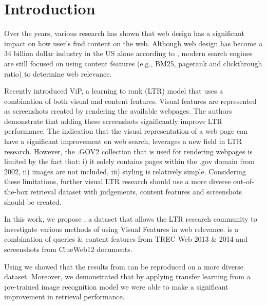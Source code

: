 

\section{Introduction}
Over the years, various research has shown that web design has a significant impact on how user's find content on the web\cite{nielsen1999designing}\cite{nielsen2006f}\cite{pernice2017f}.  Although web design has become a 34 billion dollar industry in the US alone according to \citet{ibisdesign}, modern search engines are still focused on using content features (e.g., BM25, pagerank and clickthrough ratio) to determine web relevance. 

Recently \citet{fan2017learning} introduced ViP, a learning to rank (LTR) model that uses a combination of both visual and content features. Visual features are represented as screenshots created by rendering the available webpages. The authors demonstrate that adding these screenshots significantly improve LTR performance. The indication that the visual representation of a web page can have a significant improvement on web search, leverages a new field in LTR research. 
However, the .GOV2 collection that is used for rendering webpages is limited by the fact that: i) it solely contains pages within the .gov domain from 2002, ii) images are not included, iii) styling is relatively simple. Considering these limitations, further visual LTR research should use a more diverse out-of-the-box retrieval dataset with judgements, content features and screenshots should be created. 

In this work, we propose \datasetname, a dataset that allows the LTR research community to investigate various methods of using Visual Features in web relevance. \datasetname is a combination of queries \& content features from TREC Web 2013 \& 2014 and screenshots from ClueWeb12 documents. 

Using \datasetname we showed that the results from \citet{fan2017learning} can be reproduced on a more diverse dataset. Moreover, we demonstrated that by applying transfer learning from a pre-trained image recognition model we were able to make a significant improvement in retrieval performance. 

